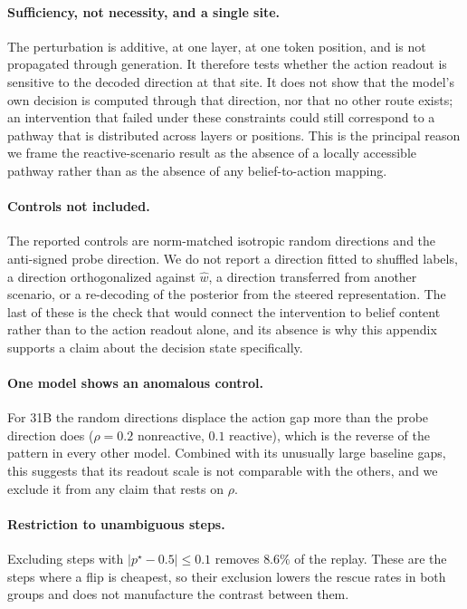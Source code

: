 \paragraph{Sufficiency, not necessity, and a single site.}
The perturbation is additive, at one layer, at one token position, and is not
propagated through generation. It therefore tests whether the action readout is
sensitive to the decoded direction at that site. It does not show that the
model's own decision is computed through that direction, nor that no other
route exists; an intervention that failed under these constraints could still
correspond to a pathway that is distributed across layers or positions. This is
the principal reason we frame the reactive-scenario result as the absence of a
locally accessible pathway rather than as the absence of any belief-to-action
mapping.

\paragraph{Controls not included.}
The reported controls are norm-matched isotropic random directions and the
anti-signed probe direction. We do not report a direction fitted to shuffled
labels, a direction orthogonalized against \(\hat w\), a direction transferred
from another scenario, or a re-decoding of the posterior from the steered
representation. The last of these is the check that would connect the
intervention to belief content rather than to the action readout alone, and its
absence is why this appendix supports a claim about the decision state
specifically.

\paragraph{One model shows an anomalous control.}
For  31B the random directions displace the action gap more than
the probe direction does (\(\rho=0.2\) nonreactive, \(0.1\) reactive), which is
the reverse of the pattern in every other model. Combined with its unusually
large baseline gaps, this suggests that its readout scale is not comparable with
the others, and we exclude it from any claim that rests on \(\rho\).

\paragraph{Restriction to unambiguous steps.}
Excluding steps with \(|p^\star-0.5|\le0.1\) removes \(8.6\%\) of the replay.
These are the steps where a flip is cheapest, so their exclusion lowers the
rescue rates in both groups and does not manufacture the contrast between them.
